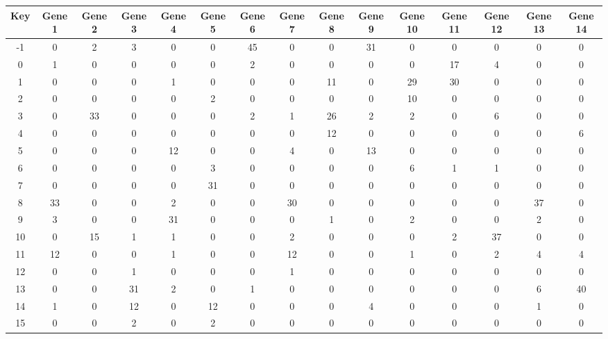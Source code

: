 \begin{tabular}{|c|c|c|c|c|c|c|c|c|c|c|c|c|c|c|}
\hline
Key & Gene 1 & Gene 2 & Gene 3 & Gene 4 & Gene 5 & Gene 6 & Gene 7 & Gene 8 & Gene 9 & Gene 10 & Gene 11 & Gene 12 & Gene 13 & Gene 14 \\
\hline
-1 & 0 & 2 & 3 & 0 & 0 & 45 & 0 & 0 & 31 & 0 & 0 & 0 & 0 & 0 \\
0 & 1 & 0 & 0 & 0 & 0 & 2 & 0 & 0 & 0 & 0 & 17 & 4 & 0 & 0 \\
1 & 0 & 0 & 0 & 1 & 0 & 0 & 0 & 11 & 0 & 29 & 30 & 0 & 0 & 0 \\
2 & 0 & 0 & 0 & 0 & 2 & 0 & 0 & 0 & 0 & 10 & 0 & 0 & 0 & 0 \\
3 & 0 & 33 & 0 & 0 & 0 & 2 & 1 & 26 & 2 & 2 & 0 & 6 & 0 & 0 \\
4 & 0 & 0 & 0 & 0 & 0 & 0 & 0 & 12 & 0 & 0 & 0 & 0 & 0 & 6 \\
5 & 0 & 0 & 0 & 12 & 0 & 0 & 4 & 0 & 13 & 0 & 0 & 0 & 0 & 0 \\
6 & 0 & 0 & 0 & 0 & 3 & 0 & 0 & 0 & 0 & 6 & 1 & 1 & 0 & 0 \\
7 & 0 & 0 & 0 & 0 & 31 & 0 & 0 & 0 & 0 & 0 & 0 & 0 & 0 & 0 \\
8 & 33 & 0 & 0 & 2 & 0 & 0 & 30 & 0 & 0 & 0 & 0 & 0 & 37 & 0 \\
9 & 3 & 0 & 0 & 31 & 0 & 0 & 0 & 1 & 0 & 2 & 0 & 0 & 2 & 0 \\
10 & 0 & 15 & 1 & 1 & 0 & 0 & 2 & 0 & 0 & 0 & 2 & 37 & 0 & 0 \\
11 & 12 & 0 & 0 & 1 & 0 & 0 & 12 & 0 & 0 & 1 & 0 & 2 & 4 & 4 \\
12 & 0 & 0 & 1 & 0 & 0 & 0 & 1 & 0 & 0 & 0 & 0 & 0 & 0 & 0 \\
13 & 0 & 0 & 31 & 2 & 0 & 1 & 0 & 0 & 0 & 0 & 0 & 0 & 6 & 40 \\
14 & 1 & 0 & 12 & 0 & 12 & 0 & 0 & 0 & 4 & 0 & 0 & 0 & 1 & 0 \\
15 & 0 & 0 & 2 & 0 & 2 & 0 & 0 & 0 & 0 & 0 & 0 & 0 & 0 & 0 \\
\hline
\end{tabular}